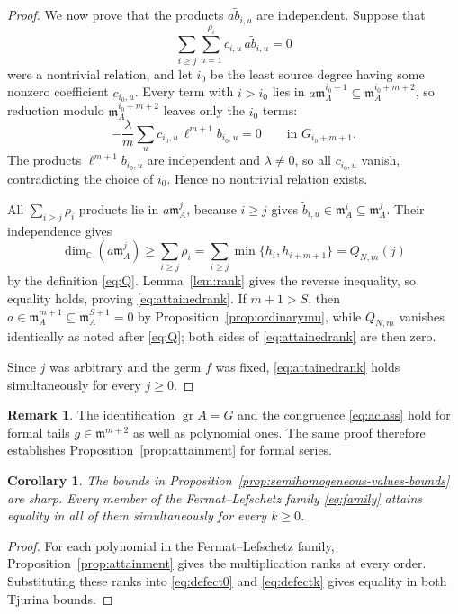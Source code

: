 \documentclass[12pt,reqno]{amsart}
\newcommand{\C}{\mathbb C}
\newcommand{\mm}{\mathfrak m}
\newcommand{\gr}{\operatorname{gr}}
\newtheorem{corollary}[theorem]{Corollary}
\theoremstyle{definition}
\newtheorem{remark}[theorem]{Remark}
\begin{document}
\begin{proof}
We now prove that the products $a\widetilde b_{i,u}$
are independent. Suppose that
\[
 \sum_{i\geq j}\sum_{u=1}^{\rho_i}
       c_{i,u}\,a\widetilde b_{i,u}=0
\]
were a nontrivial relation, and let $i_0$ be the least source
degree having some nonzero coefficient $c_{i_0,u}$.
Every term with $i>i_0$ lies in
$a\mm_A^{i_0+1}\subseteq\mm_A^{i_0+m+2}$, so reduction modulo
$\mm_A^{i_0+m+2}$ leaves only the $i_0$ terms:
\[
 -\frac{\lambda}{m}\sum_{u}c_{i_0,u}\,\ell^{m+1}b_{i_0,u}=0
 \qquad\text{in }G_{i_0+m+1}.
\]
The products $\ell^{m+1}b_{i_0,u}$ are independent and
$\lambda\ne0$, so all $c_{i_0,u}$ vanish, contradicting the choice
of $i_0$. Hence no nontrivial relation exists.

All $\sum_{i\geq j}\rho_i$ products lie in $a\mm_A^j$, because
$i\geq j$ gives
$\widetilde b_{i,u}\in\mm_A^i\subseteq\mm_A^j$.
Their independence gives
\[
 \dim_\C(a\mm_A^j)\geq\sum_{i\geq j}\rho_i
 =\sum_{i\geq j}\min\{h_i,h_{i+m+1}\}=Q_{N,m}(j)
\]
by the definition \eqref{eq:Q}. Lemma~\ref{lem:rank} gives the
reverse inequality, so equality holds, proving
\eqref{eq:attainedrank}.
If $m+1>S$, then
$a\in\mm_A^{m+1}\subseteq\mm_A^{S+1}=0$ by
Proposition~\ref{prop:ordinarymu}, while $Q_{N,m}$ vanishes
identically as noted after \eqref{eq:Q}; both sides of
\eqref{eq:attainedrank} are then zero.

Since $j$ was arbitrary and the germ $f$ was fixed,
\eqref{eq:attainedrank} holds simultaneously for every $j\geq0$.
\end{proof}
 


\begin{remark}\label{rem:attainment-input}
The identification $\gr A=G$ and the congruence \eqref{eq:aclass}
hold for formal tails $g\in\mm^{m+2}$ as well as polynomial ones.
The same proof therefore establishes Proposition~\ref{prop:attainment}
for formal series.

\end{remark}

 


\begin{corollary}\label{cor:semihomogeneous-sharp}
The bounds in Proposition~\ref{prop:semihomogeneous-values-bounds}
are sharp. Every member of the Fermat--Lefschetz family
\eqref{eq:family} attains equality in all of them
simultaneously for every $k\ge 0$.
\end{corollary}

\begin{proof}
For each polynomial in the Fermat--Lefschetz family,
Proposition~\ref{prop:attainment} gives the multiplication ranks
at every order. Substituting these ranks into \eqref{eq:defect0}
and \eqref{eq:defectk} gives equality in both Tjurina bounds.

\end{proof}
\end{document}
